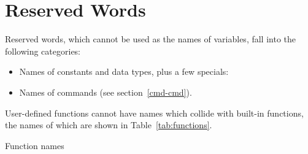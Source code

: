 \chapter{Reserved Words}
\label{reswords}

Reserved words, which cannot be used as the names of variables, fall
into the following categories:

\begin{itemize}
\item Names of constants and data types, plus a few specials:
  
  
\item Names of  commands (see section~\ref{cmd-cmd}).
\end{itemize}

User-defined functions cannot have names which collide with built-in
functions, the names of which are shown in Table~\ref{tab:functions}.

\begin{table}[htbp]
\caption{Function names}
\label{tab:functions}
\begin{center}

\end{center}
\end{table}

